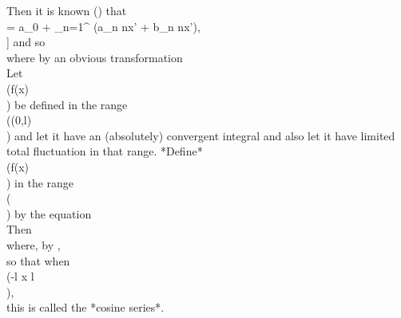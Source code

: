 Then it is known () that
\\[ 
\frac{1}{2} [F(x'+0) + F(x'-0)]
=
 a_{0} + \sum_{n=1}^{\infty} (a_{n} \cos nx' + b_{n} \sin nx'),
\\] 
and so
\\[ \begin{align*}
  & \frac{1}{2} \left\{ f(x+0) + f(x-0)\right\}
  \\
  &
  \hfill
  =
  \frac{1}{2} a_{0}
  +
  \sum_{n=1}^{\infty}
  \left\{
    a_{n} \cos \frac{n \pi (2x-a-b)}{b-a}
    +
    b_{n} \sin \frac{n \pi (2x-a-b)}{b-a}
  \right\},
\end{align*} \\]
where by an obvious transformation
\\[ \begin{align*}
  \frac{1}{2} (b-a) a_{n} =& \int_{a}^{b}\! f(x) \cos \frac{n \pi (2x-a-b)}{b-a} \, d x,
  \\
  \frac{1}{2} (b-a) b_{n} =& \int_{a}^{b}\! f(x) \sin \frac{n \pi (2x-a-b)}{b-a} \, d x
  .
\end{align*} \\]
Let \\(f(x)\\) be defined in the range \\((0,l)\\) and let it have an
(absolutely) convergent integral and also let it have limited
total fluctuation in that range.
*Define* \\(f(x)\\) in the range
\\(\\)
by the equation
\\[ 
f(-x) = f(x).\index{Even functions}
\\] 

Then
\\[ 
\frac{1}{2} \left\{ f(x+0) + f(x-0) \right\}
=
\frac{1}{2} a_{0}
+
\sum_{n=1}^{\infty} \left\{
  a_{n} \cos \frac{n \pi x}{l}
  +
  b_{n} \sin \frac{n \pi x}{l}
\right\},
\\] 
where, by ,
\\[ \begin{align*}
  l a_{n}
  =&
  \int_{-l}^{l}\! f(t) \cos \frac{n \pi t}{l} \, d t
  =
  2 \! \int_{0}^{l}\! f(t) \cos \frac{n \pi t}{l} \, d t,
  \\
  l b_{n}
  =&
  \int_{-l}^{l}\! f(t) \sin \frac{n \pi t}{l} \, d t
  = 0,
\end{align*} \\]
so that when \\(-l \leq x \leq l\\),
\\[ 
\frac{1}{2} \left\{ f(x+0) + f(x-0) \right\}
=
\frac{1}{2} a_{0} + \sum_{n=1}^{\infty} a_{n} \cos \frac{n \pi x}{l};
\\] 
this is called the *cosine series*.

